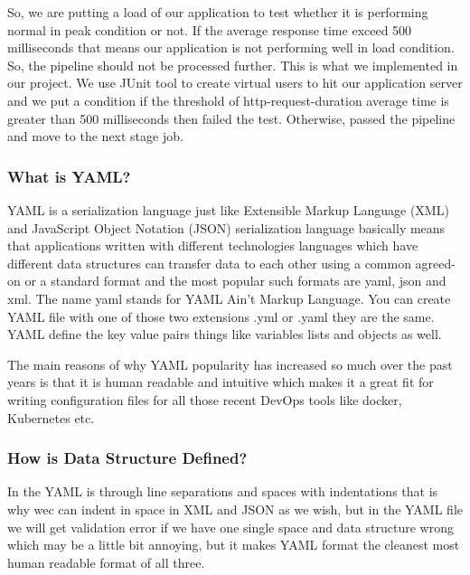 So, we are putting a load of our application to test whether it is performing normal in peak condition or not. If the average response time exceed 500 milliseconds that means our application is not performing well in load condition. So, the pipeline should not be processed further. This is what we implemented in our project. We use JUnit tool to create virtual users to hit our application server and we put a condition if the threshold of http-request-duration average time is greater than 500 milliseconds then failed the test. Otherwise, passed the pipeline and move to the next stage job.


\subsubsection{What is YAML?}

YAML is a serialization language just like Extensible Markup Language (XML) and JavaScript Object Notation (JSON) serialization language basically means that applications written with different technologies languages which have different data structures can transfer data to each other using a common agreed-on or a standard format and the most popular such formats are yaml, json and xml. The name yaml stands for YAML Ain't Markup Language. You can create YAML file with one of those two extensions .yml or .yaml they are the same. YAML define the key value pairs things like variables lists and objects as well.

The main reasons of why YAML popularity has increased so much over the past years is that it is human readable and intuitive which makes it a great fit for writing configuration files for all those recent DevOps tools like docker, Kubernetes etc.

\subsubsection{How is Data Structure Defined?}

In the YAML is through line separations and spaces with indentations that is why wec can indent in space in XML and JSON as we wish, but in the YAML file we will get validation error if we have one single space and data structure wrong which may be a little bit annoying, but it makes YAML format the cleanest most human readable format
of all three.




